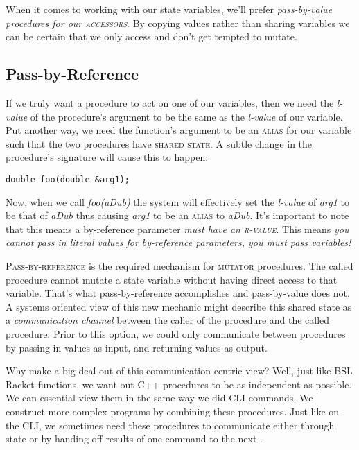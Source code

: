 When it comes to working with our state variables, we'll prefer \textit{pass-by-value procedures for our \textsc{accessors}}.  By copying values rather than sharing variables we can be certain that we only access and don't get tempted to mutate.   

\subsection{Pass-by-Reference}

If we truly want a procedure to act on one of our variables, then we need the \textit{l-value} of the procedure's argument to be the same as the \textit{l-value} of our variable.  Put another way, we need the function's argument to be an \textsc{alias} for our variable such that the two procedures have \textsc{shared state}.  A subtle change in the procedure's signature will cause this to happen:
\begin{verbatim}
double foo(double &arg1);
\end{verbatim}
Now, when we call \textit{foo(aDub)} the system will effectively set the \textit{l-value} of \textit{arg1} to be that of \textit{aDub} thus causing \textit{arg1} to be an \textsc{alias} to \textit{aDub}. It's important to note that this means a by-reference parameter \textit{must have an \textsc{r-value}}. This means \textit{you cannot pass in literal values for by-reference parameters, you must pass variables!}

\textsc{Pass-by-reference} is the required mechanism for \textsc{mutator} procedures. The called procedure cannot mutate a state variable without having direct access to that variable. That's what pass-by-reference accomplishes and pass-by-value does not. A systems oriented view of this new mechanic might describe this shared state as a \textit{communication channel} between the caller of the procedure and the called procedure. Prior to this option, we could only communicate between procedures by passing in values as input, and returning values as output. 

Why make a big deal out of this communication centric view? Well, just like BSL Racket functions, we want out C++ procedures to be as independent as possible.  We can essential view them in the same way we did CLI commands.  We construct more complex programs by combining these procedures. Just like on the CLI, we sometimes need these procedures to communicate either through state or by handing off results of one command to the next . 

